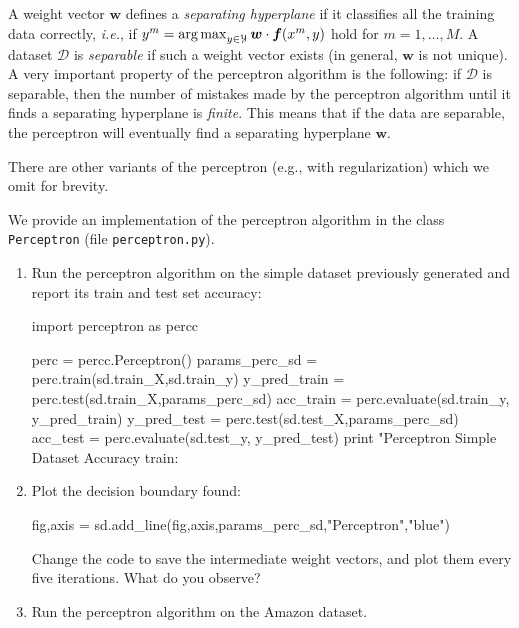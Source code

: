 A weight vector $\boldsymbol{w}$ defines a \emph{separating hyperplane} if it classifies 
all the training data correctly, \emph{i.e.}, if $y^m = \operatorname*{arg\,max}_{y \in \mathcal{Y}} \boldsymbol{w} \cdot \boldsymbol{f}(x^m,y)$ 
hold for $m = 1,\ldots,M$. A dataset $\mathcal{D}$ is \emph{separable} 
if such a weight vector exists (in general, $\boldsymbol{w}$ is not unique). 
A very important property of the perceptron algorithm is the following: 
if $\mathcal{D}$ is separable, then the 
number of mistakes made by the perceptron algorithm until it finds a separating hyperplane is \emph{finite}.  
This means that if the data are separable, the perceptron will eventually find a separating hyperplane $\boldsymbol{w}$. 


There are other variants of the perceptron (e.g., with regularization) which we omit for brevity. 

\begin{exercise}
We provide an implementation of the perceptron algorithm in the class {\tt Perceptron} 
(file {\tt perceptron.py}).  
\begin{enumerate}
\item Run the perceptron algorithm on the simple dataset
previously generated and report its train and test set accuracy: 
\begin{python}
import perceptron as percc

perc = percc.Perceptron()
params_perc_sd = perc.train(sd.train_X,sd.train_y)
y_pred_train = perc.test(sd.train_X,params_perc_sd)
acc_train = perc.evaluate(sd.train_y, y_pred_train)
y_pred_test = perc.test(sd.test_X,params_perc_sd)
acc_test = perc.evaluate(sd.test_y, y_pred_test)
print "Perceptron Simple Dataset Accuracy train: %
\end{python}

\item Plot the decision boundary found:
\begin{python}
fig,axis = sd.add_line(fig,axis,params_perc_sd,"Perceptron","blue")
\end{python}
Change the code to save the intermediate weight vectors,
and plot them every five iterations. What do you observe?

\item Run the perceptron algorithm on the Amazon dataset. 
\end{enumerate}
\end{exercise}

